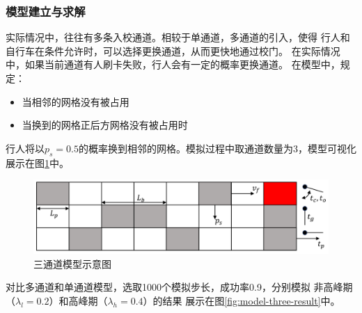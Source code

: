 \subsubsection{模型建立与求解}
\par 实际情况中，往往有多条入校通道。相较于单通道，多通道的引入，使得
行人和自行车在条件允许时，可以选择更换通道，从而更快地通过校门。
在实际情况中，如果当前通道有人刷卡失败，行人会有一定的概率更换通道。
在模型中，规定：
\begin{itemize}
    \item 当相邻的网格没有被占用
    \item 当换到的网格正后方网格没有被占用时
\end{itemize}
行人将以$p_s=0.5$的概率换到相邻的网格。模拟过程中取通道数量为3，模型可视化
展示在图\ref{fig:3-lanes-model}中。
\begin{figure}[ht]
    \centering
    \includegraphics[width=.7\textwidth]{images/cellular_automata_3_lanes.png}
    \caption{三通道模型示意图}
    \label{fig:3-lanes-model}
\end{figure}
\par 对比多通道和单通道模型，选取1000个模拟步长，成功率0.9，分别模拟
非高峰期（$\lambda_l = 0.2$）和高峰期（$\lambda_h = 0.4$）的结果
展示在图\ref{fig:model-three-result}中。
